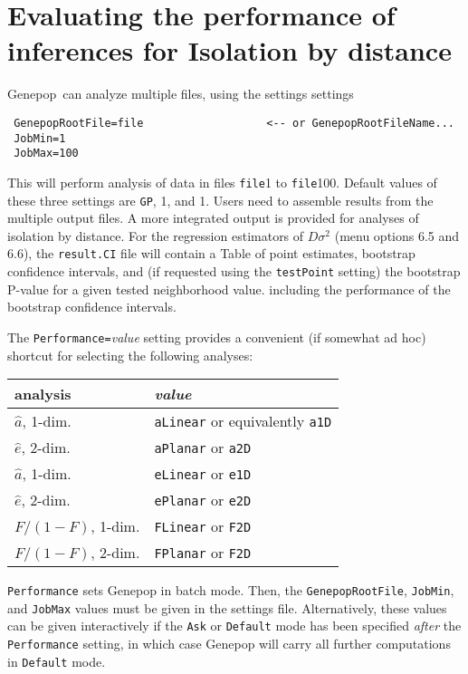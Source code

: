 \documentclass[12pt,]{book}
\theoremstyle{definition}
\theoremstyle{definition}
\theoremstyle{definition}
\theoremstyle{remark}
\begin{document}
\chapter{Evaluating the performance of inferences for Isolation by
distance}\label{evaluating-the-performance-of-inferences-for-isolation-by-distance}

Genepop~can analyze multiple files, using the settings settings

\begin{verbatim}
 GenepopRootFile=file                   <-- or GenepopRootFileName...
 JobMin=1
 JobMax=100
\end{verbatim}

   This will
perform analysis of data in files \texttt{file}1 to \texttt{file}100.
Default values of these three settings are \texttt{GP}, 1, and 1. Users
need to assemble results from the multiple output files. A more
integrated output is provided for analyses of isolation by distance. For
the regression estimators of \(D\sigma^2\) (menu options 6.5 and 6.6),
the \texttt{result.CI} file will contain a Table of point estimates,
bootstrap confidence intervals, and (if requested using the
\texttt{testPoint} setting) the bootstrap P-value for a given tested
neighborhood value. including the performance of the bootstrap
confidence intervals.

The \texttt{Performance=}\emph{value} setting
provides a convenient (if somewhat ad hoc) shortcut for selecting the
following analyses:

\begin{longtable}[]{@{}ll@{}}
\toprule
analysis & \emph{value}\tabularnewline
\midrule
\endhead
\(\hat{a}\), 1-dim. & \texttt{aLinear} or equivalently
\texttt{a1D}\tabularnewline
\(\hat{e}\), 2-dim. & \texttt{aPlanar} or \texttt{a2D}\tabularnewline
\(\hat{a}\), 1-dim. & \texttt{eLinear} or \texttt{e1D}\tabularnewline
\(\hat{e}\), 2-dim. & \texttt{ePlanar} or \texttt{e2D}\tabularnewline
\(F/(1-F)\), 1-dim. & \texttt{FLinear} or \texttt{F2D}\tabularnewline
\(F/(1-F)\), 2-dim. & \texttt{FPlanar} or \texttt{F2D}\tabularnewline
\bottomrule
\end{longtable}

\texttt{Performance} sets Genepop in batch mode. Then,
the \texttt{GenepopRootFile}, \texttt{JobMin}, and \texttt{JobMax}
values must be given in the settings file. Alternatively, these values
can be given interactively if the \texttt{Ask} or \texttt{Default} mode
 has been specified \emph{after} the \texttt{Performance}
setting, in which case Genepop will carry all further computations in
\texttt{Default} mode.
\end{document}
